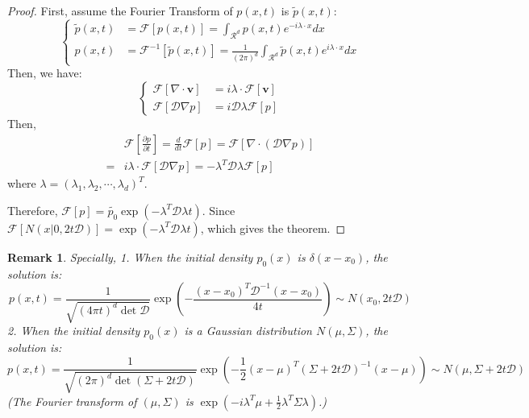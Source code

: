 \documentclass{article}
\newtheorem{proof}{Proof}
\newtheorem{remark}{Remark}
\begin{document}
\begin{proof}
    First, assume the Fourier Transform of $p(x, t)$ is $\tilde{p}(x, t)$:
    \begin{equation}\left\{
        \begin{aligned}
            \tilde{p}(x, t) &= \mathscr{F}\left[p(x, t)\right]=\int_{\mathcal{R}^d} p(x, t)e^{-i\lambda\cdot x}dx\\
            p(x, t) &= \mathscr{F}^{-1}\left[\tilde{p}(x, t)\right]=\frac{1}{(2\pi)^d}\int_{\mathcal{R}^d} \tilde{p}(x, t)e^{i\lambda\cdot x}dx
        \end{aligned}\right.
    \end{equation} 
    Then, we have:
    \begin{equation}\left\{
        \begin{aligned}
            \mathscr{F}\left[\nabla\cdot \mathbf{v}\right] &= i\lambda\cdot \mathscr{F}\left[\mathbf{v}\right]\\
            \mathscr{F}\left[\mathcal{D}\nabla p\right] &= i\mathcal{D}\lambda\mathscr{F}\left[p\right]
        \end{aligned}\right.
    \end{equation}
    Then, 
    \begin{equation}
        \begin{aligned}
            &\mathscr{F}\left[\frac{\partial p}{\partial t}\right] = \frac{d}{dt}\mathscr{F}\left[p\right] = \mathscr{F}\left[\nabla\cdot\left(\mathcal{D}\nabla p\right)\right] \\
            =& i\lambda\cdot \mathscr{F}\left[\mathcal{D}\nabla p\right]=-\lambda^T\mathcal{D}\lambda \mathscr{F}\left[p\right]
        \end{aligned}
    \end{equation}
    where $\lambda = \left(\lambda_1, \lambda_2, \cdots, \lambda_d\right)^T$. 

    Therefore, $\mathscr{F}\left[p\right] = \tilde{p_0}\exp\left(-\lambda^T\mathcal{D}\lambda t\right)$. 
    Since $\mathscr{F}\left[N(x|0, 2t\mathcal{D})\right]=\exp\left(-\lambda^T\mathcal{D}\lambda t\right)$, which gives the theorem.
\end{proof}

\begin{remark}
    Specially, 1. When the initial density $p_0(x)$ is $\delta(x - x_0)$, the solution is:
\begin{equation}
    p(x, t) = \frac{1}{\sqrt{(4\pi t)^d\det{\mathcal{D}}}}\exp\left(-\frac{(x-x_0)^T\mathcal{D}^{-1}(x-x_0)}{4t}\right)\sim N(x_0, 2t\mathcal{D})
\end{equation}
2. When the initial density $p_0(x)$ is a Gaussian distribution $N(\mu, \Sigma)$, the solution is:
\begin{equation}
    p(x, t) = \frac{1}{\sqrt{(2\pi)^d\det(\Sigma + 2t\mathcal{D})}}\exp\left(-\frac{1}{2}\left(x-\mu\right)^T\left(\Sigma + 2t\mathcal{D}\right)^{-1}\left(x-\mu\right)\right)\sim N(\mu, \Sigma + 2t\mathcal{D})
\end{equation}
(The Fourier transform of $\left(\mu, \Sigma \right)$ is $\exp \left(-i\lambda^T\mu + \frac{1}{2}\lambda^T\Sigma\lambda\right)$.)
\end{remark}
\end{document}
